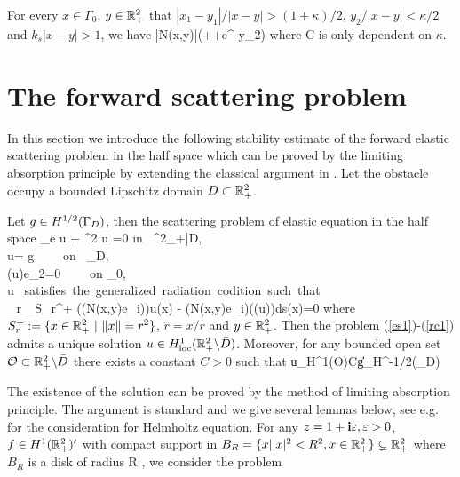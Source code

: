 \documentclass[12pt]{iopart}
\begin{document}
\begin{lem}\label{es_ngreen}
	For every $x\in\Gamma_0$, $y\in{\mathbb{R}}_+^2$ that $|x_1-y_1|/|x-y|>(1+\kappa)/2$, $y_2/|x-y|<\kappa/2$ and $k_s |x-y|>1$, we have
	\be\hspace{-2.5cm}
	|N(x,y)|\leq {}\Bigg(++e^{-y_2}\Bigg)
	\ee
	where C is only dependent on $\kappa$.
\end{lem}


\section{The forward scattering problem}

In this section we introduce the following stability estimate of the forward elastic scattering problem in the half space which can be proved by the limiting absorption principle by extending the classical argument in \cite{leis,wilcox1975,Yves1988}. Let the obstacle occupy a bounded Lipschitz domain $D\subset {\mathbb{R}}^2_+$.
\begin{thm} \label{eu1}
	Let $g \in H^{1/2}(\Gamma_D)$, then the scattering problem of elastic equation in the half space
	\be
	\Delta_e u + \omega^2 u =0 \qquad\mbox{\rm in } \R^2_+\bks \bar{D}, \label{es1}\ \ \
	\\ u= g \ \ \ \ \mbox{\rm on } \Ga_D, \label{es2} \\
	\sigma(u)e_2=0 \ \ \ \ \mbox{\rm on} \Ga_0, \label{es3} \\
	u \ \mbox{satisfies the generalized radiation codition\cite{Guzina2006} such that} \nn \\\label{rc1}
	\lim_{r\to\infty}  \int_{S_r^+} (\sigma(N(x,y)e_i))\cdot u(x) - (N(x,y)e_i)\cdot (\sigma(u)\hat{r})ds(x)=0
	\ee
	where $S_r^+:=\{x\in {\mathbb{R}}^2_+ \ | \ \|x\|=r^2\}$, $\hat{r}=x/r$ and $y\in {\mathbb{R}}_+^2$. Then the problem (\ref{es1})-(\ref{rc1})
	admits a unique solution $u \in H^{1}_{\rm loc}({\mathbb{R}}^2_+ \backslash \bar D)$. Moreover, for any bounded open set $\mathcal O\subset {\mathbb{R}}^2_+\backslash\bar D$ there exists a constant $C>0$ such that
	\be \label{es4}
	\|u\|_{H^{1}(\mathcal O)}\le C\|g\|_{H^{-1/2}(\Ga_D)}
	\ee
\end{thm}
The existence of the solution can be proved by the method of limiting absorption principle. The argument is standard and we give several lemmas below, see e.g. \cite{leis} for the consideration for Helmholtz equation. For any $z=1+\mathbf{i}\varepsilon,\varepsilon>0$, $f\in H^{1}({\mathbb{R}}^2_+)'$ with compact support in $B_R=\{x||x|^2<R^2,x\in{\mathbb{R}}^2_+\}\subsetneq{\mathbb{R}}_+^2$ where $B_R$ is a disk of radius R , we consider the problem
\end{document}

